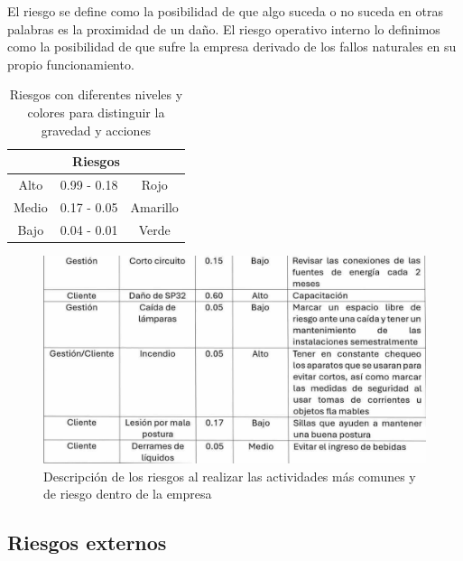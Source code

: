     El riesgo se define como la posibilidad de que algo suceda o no suceda en otras palabras es la proximidad de un daño. 
    El riesgo operativo interno lo definimos como la posibilidad de que sufre la empresa derivado de los fallos naturales en su propio funcionamiento.
    \begin{table}[h]
        \centering
        \caption{Riesgos con diferentes niveles y colores para distinguir la gravedad y acciones}
        \begin{tabular}{|c| c| c|}
        \hline
        \multicolumn{3}{|c|}{Riesgos}\\
        \hline
             Alto& 0.99 - 0.18 & Rojo  \\
        \hline     
             Medio& 0.17 - 0.05 & Amarillo \\
        \hline
             Bajo& 0.04 - 0.01 & Verde \\
        \hline
        \end{tabular}
        \label{tab:Riesgos}
    \end{table}
    \begin{figure}[H]
        \centering
        \includegraphics[trim = {1mm 1mm 1mm 1mm},clip,scale=0.3]{8/Img/Riesgos0.pdf}
        \caption{Descripción de los riesgos al realizar las actividades más comunes y de riesgo dentro de la empresa}
        \label{Riesgos internos}
    \end{figure}
    \subsection{Riesgos externos}
    
